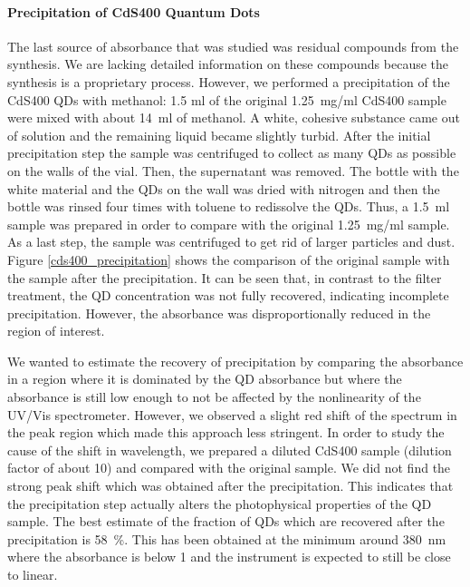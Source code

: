 \documentclass[cits]{JINST}
\begin{document}
\paragraph{Precipitation of CdS400 Quantum Dots}
\label{precipitation_subsection} 
The last source of absorbance that was studied was residual compounds from the synthesis. We are lacking detailed information on these compounds because the synthesis is a proprietary process. However, we performed a precipitation of the CdS400 QDs with methanol: 1.5 ml of the original 1.25~mg/ml CdS400 sample were mixed with about 14~ml of methanol. A white, cohesive substance came out of solution and the remaining liquid became slightly turbid. After the initial precipitation step the sample was centrifuged to collect as many QDs as possible on the walls of the vial. Then, the supernatant was removed. The bottle with the white material and the QDs on the wall was dried with nitrogen and then the bottle was rinsed four times with toluene to redissolve the QDs. Thus, a 1.5~ml sample was prepared in order to compare with the original 1.25~mg/ml sample. As a last step, the sample was centrifuged to get rid of larger particles and dust. Figure \ref{cds400_precipitation} shows the comparison of the original sample with the sample after the precipitation. It can be seen that, in contrast to the filter treatment, the QD concentration was not fully recovered, indicating incomplete precipitation. However, the absorbance was disproportionally reduced in the region of interest. 

We wanted to estimate the recovery of precipitation by comparing the absorbance in a region where it is dominated by the QD absorbance but where the absorbance is still low enough to not be affected by the nonlinearity of the UV/Vis spectrometer. However, we observed a slight red shift of the spectrum in the peak region which made this approach less stringent. In order to study the cause of the shift in wavelength, we prepared a diluted CdS400 sample (dilution factor of about 10) and compared with the original sample. We did not find the strong peak shift which was obtained after the precipitation. This indicates that the precipitation step actually alters the photophysical properties of the QD sample. The best estimate of the fraction of QDs which are recovered after the precipitation is 58~\%. This has been obtained at the minimum around 380~nm where the absorbance is below 1 and the instrument is expected to still be close to linear. 
\end{document}
